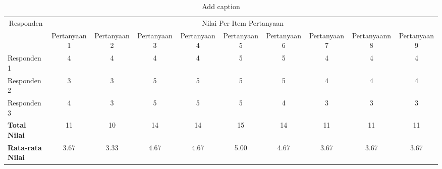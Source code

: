 \begin{table}[htbp]
  \centering
  \caption{Add caption}
    \begin{tabular}{|l|c|c|c|c|c|c|c|c|c|}
    \toprule
    \multicolumn{1}{|c|}{\multirow{2}[4]{*}{Responden}} & \multicolumn{9}{c|}{Nilai Per Item Pertanyaan} \\
\cmidrule{2-10}          & Pertanyaan 1 & Pertanyaan 2 & Pertanyaan 3 & Pertanyaan 4 & Pertanyaan 5 & Pertanyaan 6 & Pertanyaan 7 & Pertanyaann 8 & Pertanyaan 9 \\
    \midrule
    Responden 1 & 4     & 4     & 4     & 4     & 5     & 5     & 4     & 4     & 4 \\
    \midrule
    Responden 2 & 3     & 3     & 5     & 5     & 5     & 5     & 4     & 4     & 4 \\
    \midrule
    Responden 3 & 4     & 3     & 5     & 5     & 5     & 4     & 3     & 3     & 3 \\
    \midrule
    \textbf{Total Nilai} & 11    & 10    & 14    & 14    & 15    & 14    & 11    & 11    & 11 \\
    \midrule
    \textbf{Rata-rata Nilai} & 3.67  & 3.33  & 4.67  & 4.67  & 5.00  & 4.67  & 3.67  & 3.67  & 3.67 \\
    \bottomrule
    \end{tabular}%
  \label{tab:addlabel}%
\end{table}%
